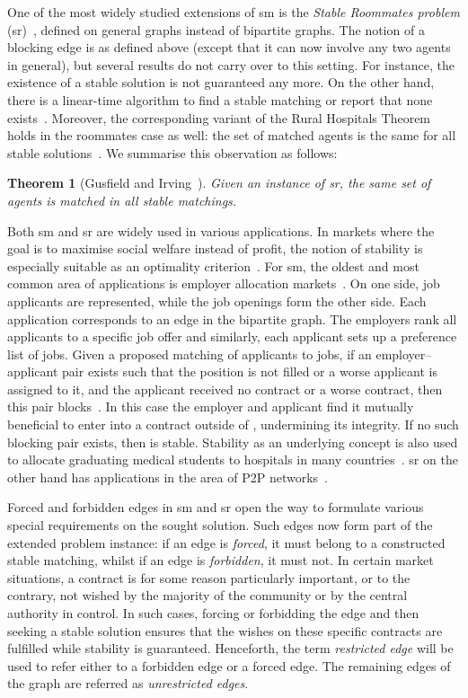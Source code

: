 \documentclass[preprint,12pt]{elsarticle}
\newtheorem{theorem}{Theorem}[section]
\begin{document}
One of the most widely studied  extensions of {\sc sm} is the \emph{Stable Roommates problem} ({\sc sr})~\cite{GS62,Irv85}, defined on general graphs instead of bipartite graphs. The notion of a blocking edge is as defined above (except that it can now involve any two agents in general), but several results do not carry over to this setting. For instance, the existence of a stable solution is not guaranteed any more. On the other hand, there is a linear-time algorithm to find a stable matching or report that none exists~\cite{Irv85}. Moreover, the corresponding variant of the Rural Hospitals Theorem holds in the roommates case as well: the set of matched agents is the same for all stable solutions~\cite{GI89}. We summarise this observation as follows:
\begin{theorem}[Gusfield and Irving~\cite{GI89}]
Given an instance of {\sc sr}, the same set of agents is matched in all stable matchings.
\label{th:rural}
\end{theorem}

Both {\sc sm} and {\sc sr} are widely used in various applications. In markets where the goal is to maximise social welfare instead of profit, the notion of stability is especially suitable as an optimality criterion~\cite{Rot84}. For {\sc sm}, the oldest and most common area of applications is employer allocation markets~\cite{RS90}.  On one side, job applicants are represented, while the job openings form the other side. Each application corresponds to an edge in the bipartite graph. The employers rank all applicants to a specific job offer and similarly, each applicant sets up a preference list of jobs. Given a proposed matching  of applicants to jobs, if an employer--applicant pair exists such that the position is not filled or a worse applicant is assigned to it, and the applicant received no contract or a worse contract, then this pair blocks~. In this case the employer and applicant find it mutually beneficial to enter into a contract outside of , undermining its integrity. If no such blocking pair exists, then  is stable. Stability as an underlying concept is also used to allocate graduating medical students to hospitals in many countries~\cite{Rot08}. {\sc sr} on the other hand has applications in the area of P2P networks~\cite{GLMMRV07}.

Forced and forbidden edges in {\sc sm} and {\sc sr} open the way to formulate various special requirements on the sought solution. Such edges now form part of the extended problem instance: if an edge is \emph{forced}, it must belong to a constructed stable matching, whilst if an edge is \emph{forbidden}, it must not.
In certain market situations, a contract is for some reason particularly important, or to the contrary, not wished by the majority of the community or by the central authority in control. In such cases, forcing or forbidding the edge and then seeking a stable solution ensures that the wishes on these specific contracts are fulfilled while stability is guaranteed. Henceforth, the term \emph{restricted edge} will be used to refer either to a forbidden edge or a forced edge. The remaining edges of the graph are referred as \emph{unrestricted edges}.
\end{document}

